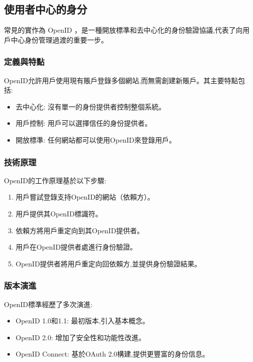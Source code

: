 \subsection{使用者中心的身分}

常見的實作為 OpenID ，是一種開放標準和去中心化的身份驗證協議,代表了向用戶中心身份管理過渡的重要一步。

\subsubsection{定義與特點}

OpenID允許用戶使用現有賬戶登錄多個網站,而無需創建新賬戶。其主要特點包括:

\begin{itemize}
  \item 去中心化: 沒有單一的身份提供者控制整個系統。
  \item 用戶控制: 用戶可以選擇信任的身份提供者。
  \item 開放標準: 任何網站都可以使用OpenID來登錄用戶。
\end{itemize}

\subsubsection{技術原理}
OpenID的工作原理基於以下步驟:
\begin{enumerate}
  \item 用戶嘗試登錄支持OpenID的網站（依賴方）。
  \item 用戶提供其OpenID標識符。
  \item 依賴方將用戶重定向到其OpenID提供者。
  \item 用戶在OpenID提供者處進行身份驗證。
  \item OpenID提供者將用戶重定向回依賴方,並提供身份驗證結果。
\end{enumerate}

\subsubsection{版本演進}
OpenID標準經歷了多次演進:
\begin{itemize}
  \item OpenID 1.0和1.1: 最初版本,引入基本概念。
  \item OpenID 2.0: 增加了安全性和功能性改進。
  \item OpenID Connect: 基於OAuth 2.0構建,提供更豐富的身份信息。
\end{itemize}

